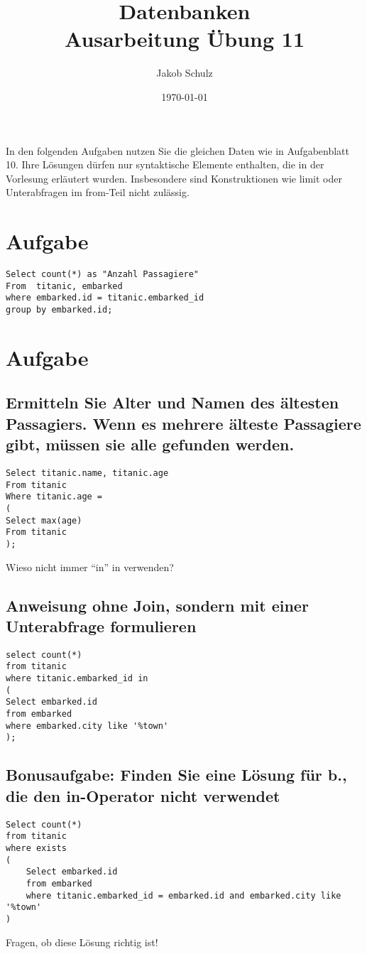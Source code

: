 \documentclass[a4paper, 11pt, titlepage]{article}
\begin{document}
\title{Datenbanken \\
Ausarbeitung \"Ubung 11}

\author{Jakob Schulz}

\date{\today}

\maketitle{\thispagestyle{plain}}
\noindent In den folgenden Aufgaben nutzen Sie die gleichen Daten wie in Aufgabenblatt 10. Ihre Lösungen 
dürfen nur syntaktische Elemente enthalten, die in der Vorlesung erläutert wurden. Insbesondere 
sind Konstruktionen wie limit oder Unterabfragen im from-Teil nicht zulässig.
\section{Aufgabe}
\begin{lstlisting}[style = sql]
Select count(*) as "Anzahl Passagiere"
From  titanic, embarked
where embarked.id = titanic.embarked_id
group by embarked.id;
\end{lstlisting}
\section{Aufgabe}
\subsection{Ermitteln Sie Alter und Namen des ältesten Passagiers. Wenn es mehrere älteste Passagiere 
gibt, müssen sie alle gefunden werden.}
\begin{lstlisting}[style = sql]
Select titanic.name, titanic.age
From titanic
Where titanic.age = 
(
Select max(age)
From titanic
);
\end{lstlisting}
Wieso nicht immer "`in"' in verwenden?
\subsection{Anweisung ohne Join, sondern mit einer Unterabfrage formulieren}
\begin{lstlisting}[style = sql]
select count(*)
from titanic 
where titanic.embarked_id in 
(
Select embarked.id
from embarked
where embarked.city like '%town'
);
\end{lstlisting}
\subsection{Bonusaufgabe: Finden Sie eine Lösung für b., die den in-Operator nicht verwendet}
\begin{lstlisting}[style = sql]
Select count(*)
from titanic
where exists
(
	Select embarked.id
	from embarked
	where titanic.embarked_id = embarked.id and embarked.city like '%town'
)
\end{lstlisting}
Fragen, ob diese Lösung richtig ist!
\end{document}
